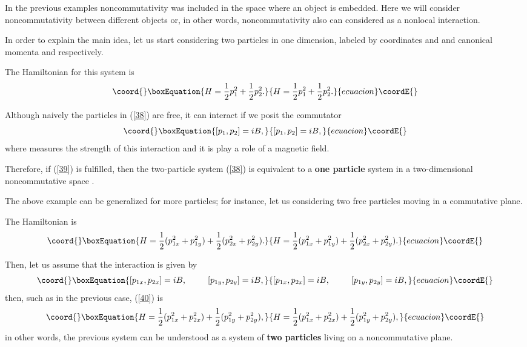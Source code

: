 \documentclass[a4paper,aps,twocolumn,amsfonts]{revtex4}
\begin{document}
   In the previous examples noncommutativity was included in the space where an object is embedded. Here we will consider noncommutativity between different objects or,  in other words, noncommutativity also can considered as a nonlocal interaction.

   In order to explain the main idea, let us start  considering two particles in one dimension, labeled by coordinates \coordHE{} and \coordHE{} and canonical momenta \coordHE{} and \coordHE{} respectively.

   The Hamiltonian for this system is
   \begin{equation}\coord{}\boxEquation{
   H=\frac{1}{2}p_1^2 + \frac{1}{2}p_2^2.
   \label{38}
   }{
   H=\frac{1}{2}p_1^2 + \frac{1}{2}p_2^2.
   }{ecuacion}\coordE{}\end{equation}


   Although naively the particles in (\ref{38}) are free, it can interact if we posit the commutator
   \begin{equation}\coord{}\boxEquation{
   [p_1,p_2]=iB, 
   \label{39}
   }{
   [p_1,p_2]=iB, 
   }{ecuacion}\coordE{}\end{equation}
   where  \coordHE{} measures the strength of this interaction and it is play a role of a magnetic field.

   Therefore, if (\ref{39}) is fulfilled, then the two-particle system (\ref{38}) is equivalent to a {\bf one particle} system in a two-dimensional noncommutative space \cite{gamboa1}.

   The above example can be generalized for more particles; for instance, let us considering two free particles moving in a commutative plane.

   The Hamiltonian  is
   \begin{equation}\coord{}\boxEquation{
   H=\frac{1}{2}(p_{1x}^2+p_{1y}^2)+\frac{1}{2}(p_{2x}^2+p_{2y}^2).
   }{
   H=\frac{1}{2}(p_{1x}^2+p_{1y}^2)+\frac{1}{2}(p_{2x}^2+p_{2y}^2).
   }{ecuacion}\coordE{}\end{equation}

   Then, let us assume that the interaction is given by
    \begin{equation}\coord{}\boxEquation{
    [p_{1x},p_{2x}]=iB,\,\,\,\,\,\,\,\,\,\,\,\,\,\,\,[p_{1y},p_{2y}]=iB,
   \label{40}
    }{
    [p_{1x},p_{2x}]=iB,\,\,\,\,\,\,\,\,\,\,\,\,\,\,\,[p_{1y},p_{2y}]=iB,
   }{ecuacion}\coordE{}\end{equation}
    then, such as in the previous case,  (\ref{40}) is
   \begin{equation}\coord{}\boxEquation{
   H=\frac{1}{2}(p_{1x}^2+ p_{2x}^2)+\frac{1}{2}(p_{1y}^2+ p_{2y}^2),
   \label{41}
   }{
   H=\frac{1}{2}(p_{1x}^2+ p_{2x}^2)+\frac{1}{2}(p_{1y}^2+ p_{2y}^2),
   }{ecuacion}\coordE{}\end{equation} 
   in other words, the previous system can be understood as a system of {\bf two particles} living on a noncommutative plane.
\end{document}
